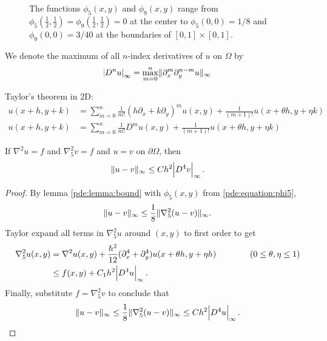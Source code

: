 \begin{figure}[t]
\centering
{}
\caption{\label{pde:figure:phi}The functions $\phi_5(x,y)$ and $\phi_9(x,y)$ range from $\phi_5(\frac12,\frac12)=\phi_9(\frac12,\frac12)=0$ at the center to $\phi_5(0,0) = 1/8$ and $\phi_9(0,0)=3/40$ at the boundaries of $[0,1]\times[0,1]$.}
\end{figure}

\begin{definition}
  We denote the maximum of all $n$-index derivatives of $u$ on $\Omega$ by
  \begin{equation*}
  \abs{D^n u}_\infty = \max_{m=0}^n \lVert \partial_x^m \partial_y^{n-m} u \rVert_\infty
  \end{equation*}
\end{definition}

Taylor's theorem in 2D:
\begin{equation*}
\begin{split}
	u(x+h,y+k) &= \sum_{m=0}^n \frac{1}{m!} \left( h \partial_x + k \partial_y \right)^m u(x,y) + \frac{1}{(m+1)!} u(x + \theta h, y + \eta k) \\
	u(x+h,y+k) &= \sum_{m=0}^n \frac{1}{m!} D^m u(x,y) + \frac{1}{(m+1)!} u(x + \theta h, y + \eta k)
\end{split}
\end{equation*}

\begin{theorem}\label{thm:five}
If $\nabla^2 u = f$ and $\nabla_5^2 v = f$ and $u = v$ on $\partial \Omega$, then
$$
\lVert u - v \rVert_\infty \leq C h^2 \abs{D^4 v}_\infty.
$$
\end{theorem}
\begin{proof}
By lemma \ref{pde:lemma:bound} with $\phi_5(x,y)$ from \ref{pde:equation:phi5},
$$
\lVert u - v \rVert_\infty \leq \frac18 \lVert \nabla_5^2 (u  - v) \rVert_\infty.
$$
Taylor expand all terms in $\nabla_5^2 u$ around $(x,y)$ to first order to get
\begin{equation}
\begin{split}
  \nabla_5^2 u(x,y)
  &=    \nabla^2 u(x,y) + \frac{h^2}{12} (\partial_x^4 + \partial_y^4) u(x + \theta h, y + \eta h) \qquad \qquad (0 \leq \theta, \eta \leq 1)  \\
  &\leq f(x,y)          + C_1 h^2 \abs{D^4 u}_\infty.
\end{split}
\label{eq:pde:taylornabla2}
\end{equation}
Finally, substitute $f = \nabla_5^2 v$ to conclude that
\begin{equation*}
  \lVert u - v \rVert_\infty
  \leq \frac18 \lVert \nabla_5^2 (u  - v) \rVert_\infty
  \leq C h^2 \abs{D^4 u}_\infty. \qedhere
\end{equation*}
\end{proof}


